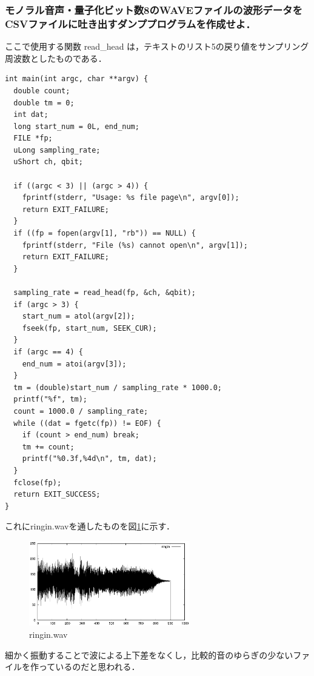 \documentclass[titlepage]{jarticle}
\begin{document}
\subsubsection{モノラル音声・量子化ビット数8のWAVEファイルの波形データをCSVファイルに吐き出すダンププログラムを作成せよ．}
ここで使用する関数 read\_head は，テキストのリスト5の戻り値をサンプリング周波数としたものである．
\begin{lstlisting}[caption=wav2txt-m8.c,label=wav2txt-m8.c]
int main(int argc, char **argv) {
  double count;
  double tm = 0;
  int dat;
  long start_num = 0L, end_num;
  FILE *fp;
  uLong sampling_rate;
  uShort ch, qbit;

  if ((argc < 3) || (argc > 4)) {
    fprintf(stderr, "Usage: %s file page\n", argv[0]);
    return EXIT_FAILURE;
  }
  if ((fp = fopen(argv[1], "rb")) == NULL) {
    fprintf(stderr, "File (%s) cannot open\n", argv[1]);
    return EXIT_FAILURE;
  }

  sampling_rate = read_head(fp, &ch, &qbit);
  if (argc > 3) {
    start_num = atol(argv[2]);
    fseek(fp, start_num, SEEK_CUR);
  }
  if (argc == 4) {
    end_num = atoi(argv[3]);
  }
  tm = (double)start_num / sampling_rate * 1000.0;
  printf("%f", tm);
  count = 1000.0 / sampling_rate;
  while ((dat = fgetc(fp)) != EOF) {
    if (count > end_num) break;
    tm += count;
    printf("%0.3f,%4d\n", tm, dat);
  }
  fclose(fp);
  return EXIT_SUCCESS;
}
    \end{lstlisting}

これにringin.wavを通したものを図\ref{ringin.wav}に示す．
\begin{figure}[H]
  \centering
  \includegraphics[width=7cm]{EPS/ringin.eps}
  \caption{ringin.wav}
  \label{ringin.wav}
\end{figure}

細かく振動することで波による上下差をなくし，比較的音のゆらぎの少ないファイルを作っているのだと思われる．
\end{document}
